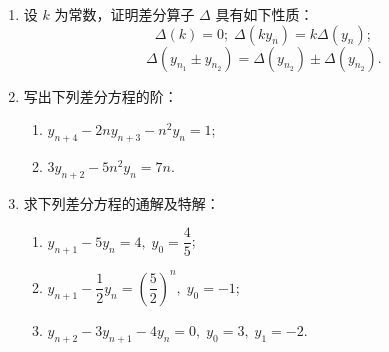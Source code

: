 \begin{enumerate}\setlength{\itemsep}{7pt}
    \item 设 $k$ 为常数，证明差分算子 $\Delta$ 具有如下性质：
    \[
        \Delta(k)=0;\;\Delta(ky_n)=k\Delta(y_n);
    \]
    \[
        \Delta(y_{n_1}\pm y_{n_2})=\Delta(y_{n_2})\pm\Delta(y_{n_2}).
    \]

    \item 写出下列差分方程的阶：
    \begin{enumerate}[(1)]\setlength{\itemsep}{5pt}\setlength{\topsep}{15pt}
        \item $y_{n+4}-2ny_{n+3}-n^2y_{n}=1$;
        \item $3y_{n+2}-5n^2y_n=7n$.
    \end{enumerate}

    \item 求下列差分方程的通解及特解：
    \begin{enumerate}[(1)]\setlength{\itemsep}{5pt}\setlength{\topsep}{15pt}
        \item $y_{n+1}-5y_n=4,\;y_0=\dfrac{4}{5}$;
        \item $y_{n+1}-\dfrac{1}{2}y_n=\left(\dfrac{5}{2}\right)^n,\;y_0=-1$;
        \item $y_{n+2}-3y_{n+1}-4y_n=0,\;y_0=3,\;y_1=-2$.
    \end{enumerate}
    
    
\end{enumerate}
